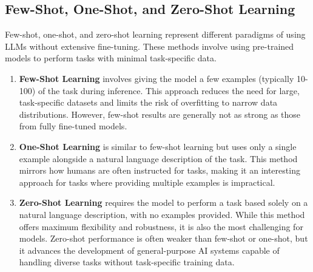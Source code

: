 \subsection{Few-Shot, One-Shot, and Zero-Shot Learning}
Few-shot, one-shot, and zero-shot learning represent different paradigms of using LLMs without extensive fine-tuning. These methods involve using pre-trained models to perform tasks with minimal task-specific data\citep{brown2020language}.
\begin{enumerate}
	\item \textbf{Few-Shot Learning} involves giving the model a few examples (typically 10-100) of the task during inference. This approach reduces the need for large, task-specific datasets and limits the risk of overfitting to narrow data distributions. However, few-shot results are generally not as strong as those from fully fine-tuned models.
	\item \textbf{One-Shot Learning} is similar to few-shot learning but uses only a single example alongside a natural language description of the task. This method mirrors how humans are often instructed for tasks, making it an interesting approach for tasks where providing multiple examples is impractical.
	\item \textbf{Zero-Shot Learning} requires the model to perform a task based solely on a natural language description, with no examples provided. While this method offers maximum flexibility and robustness, it is also the most challenging for models. Zero-shot performance is often weaker than few-shot or one-shot, but it advances the development of general-purpose AI systems capable of handling diverse tasks without task-specific training data.
\end{enumerate}

